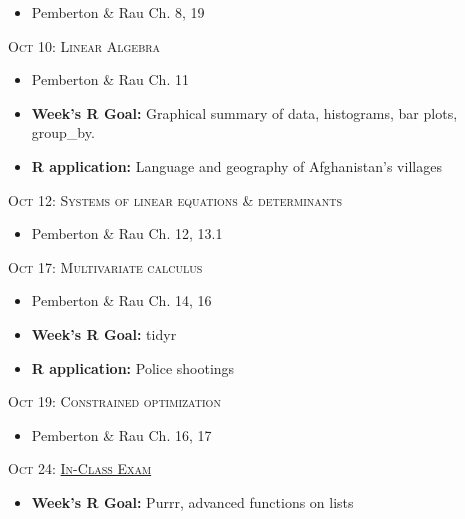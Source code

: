 \documentclass[11pt]{article}
\begin{document}
\begin{itemize}

\item Pemberton \& Rau Ch. 8, 19

\end{itemize}



\noindent \textsc{Oct 10: Linear Algebra }

\begin{itemize}

\item Pemberton \& Rau Ch. 11
\item  {\bf Week's R Goal:} Graphical summary of data, histograms, bar plots, group\_by.
\item {\bf R application: } Language and geography of Afghanistan's villages


\end{itemize}


\noindent \textsc{Oct 12: Systems of linear equations \& determinants }

\begin{itemize}
\item Pemberton \& Rau Ch. 12, 13.1


\end{itemize}


\noindent \textsc{Oct 17:  Multivariate calculus }

\begin{itemize}
\item Pemberton \& Rau Ch. 14, 16

\item  {\bf Week's R Goal:}  tidyr
\item {\bf R application: } Police shootings



\end{itemize}


\noindent \textsc{Oct 19:  Constrained optimization}

\begin{itemize}

\item Pemberton \& Rau Ch. 16, 17


\end{itemize}
\noindent \textsc{Oct 24:  \underline{In-Class Exam}}

\begin{itemize}
\item  {\bf Week's R Goal:} Purrr, advanced functions on lists
\end{itemize}
\end{document}
